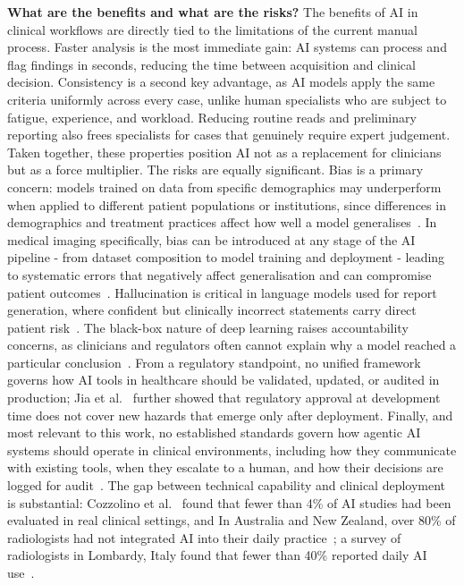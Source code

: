 \documentclass[conference]{IEEEtran}
\begin{document}
\textbf{What are the benefits and what are the risks?}
The benefits of AI in clinical workflows are directly tied to the limitations of the current manual process. Faster analysis is the most immediate gain: AI systems can process and flag findings in seconds, reducing the time between acquisition and clinical decision. Consistency is a second key advantage, as AI models apply the same criteria uniformly across every case, unlike human specialists who are subject to fatigue, experience, and workload. Reducing routine reads and preliminary reporting also frees specialists for cases that genuinely require expert judgement. Taken together, these properties position AI not as a replacement for clinicians but as a force multiplier. The risks are equally significant. Bias is a primary concern: models trained on data from specific demographics may underperform when applied to different patient populations or institutions, since differences in demographics and treatment practices affect how well a model generalises~\cite{mittermaier2023bias}. In medical imaging specifically, bias can be introduced at any stage of the AI pipeline - from dataset composition to model training and deployment - leading to systematic errors that negatively affect generalisation and can compromise patient outcomes~\cite{kocak2025bias}. Hallucination is critical in language models used for report generation, where confident but clinically incorrect statements carry direct patient risk~\cite{griot2025metacognition}. The black-box nature of deep learning raises accountability concerns, as clinicians and regulators often cannot explain why a model reached a particular conclusion~\cite{kondylakis2026futureai}. From a regulatory standpoint, no unified framework governs how AI tools in healthcare should be validated, updated, or audited in production; Jia et al.~\cite{jia2025deployment} further showed that regulatory approval at development time does not cover new hazards that emerge only after deployment. Finally, and most relevant to this work, no established standards govern how agentic AI systems should operate in clinical environments, including how they communicate with existing tools, when they escalate to a human, and how their decisions are logged for audit~\cite{trustworthyai2025}. The gap between technical capability and clinical deployment is substantial: Cozzolino et al.~\cite{cozzolino2025surveillance} found that fewer than 4\% of AI studies had been evaluated in real clinical settings, and In Australia and New Zealand, over 80\% of radiologists had not integrated AI into their daily practice~\cite{kondylakis2026futureai}; a survey of radiologists in Lombardy, Italy found that fewer than 40\% reported daily AI use~\cite{ce2024perceptions}.
\end{document}
